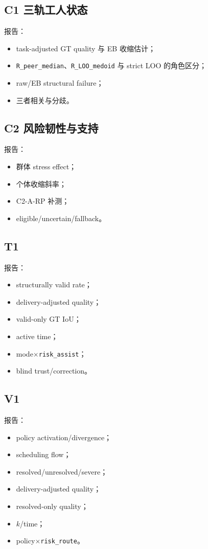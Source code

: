\subsection{C1 三轨工人状态}

报告：
\begin{itemize}
  \item task-adjusted GT quality 与 EB 收缩估计；
  \item \texttt{R\_peer\_median}、\texttt{R\_LOO\_medoid} 与 strict LOO 的角色区分；
  \item raw/EB structural failure；
  \item 三者相关与分歧。
\end{itemize}

\subsection{C2 风险韧性与支持}

报告：
\begin{itemize}
  \item 群体 stress effect；
  \item 个体收缩斜率；
  \item C2-A-RP 补测；
  \item eligible/uncertain/fallback。
\end{itemize}

\subsection{T1}

报告：
\begin{itemize}
  \item structurally valid rate；
  \item delivery-adjusted quality；
  \item valid-only GT IoU；
  \item active time；
  \item mode\(\times\)\texttt{risk\_assist}；
  \item blind trust/correction。
\end{itemize}

\subsection{V1}

报告：
\begin{itemize}
  \item policy activation/divergence；
  \item scheduling flow；
  \item resolved/unresolved/severe；
  \item delivery-adjusted quality；
  \item resolved-only quality；
  \item \(k\)/time；
  \item policy\(\times\)\texttt{risk\_route}。
\end{itemize}

